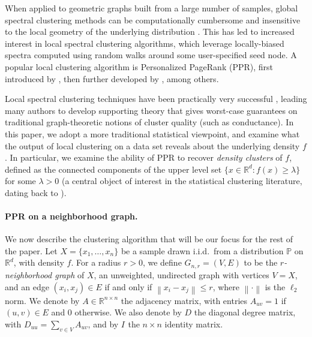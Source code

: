 \documentclass[11pt,twoside]{article}
\newcommand{\Reals}{\mathbb{R}}
\newcommand{\Rd}{\Reals^d}
\newcommand{\norm}[1]{\left\lVert#1\right\rVert}
\newcommand{\1}{\mathbf{1}}
\newcommand{\Abf}{A}
\newcommand{\Xbf}{X}             %
\newcommand{\Dbf}{D}
\newcommand{\Ibf}[1]{I_{#1}}
\newcommand{\Pbb}{\mathbb{P}}
\begin{document}
When applied to geometric graphs built from a large number of samples,
global spectral clustering methods can be computationally cumbersome and   
insensitive to the local geometry of the underlying distribution
\citep{leskovec2010,mahoney2012}.  This has led to increased interest in
local spectral clustering algorithms, which leverage locally-biased spectra
computed using random walks around some user-specified seed node.  A popular 
local clustering algorithm is Personalized PageRank (PPR), first introduced by 
\citet{haveliwala2003}, then further developed by
\citep{spielman2011,spielman2014,andersen2006,mahoney2012,zhu2013},
among others.  

Local spectral clustering techniques have been practically very successful
\citep{leskovec2010,andersen2012,gleich2012,mahoney2012,wu2012}, leading 
many authors to develop supporting theory
\citep{spielman2013,andersen2009,gharan2012,zhu2013} that gives worst-case
guarantees on traditional graph-theoretic notions of cluster quality (such as
conductance).  In this paper, we adopt a more traditional statistical viewpoint,
and examine what the output of local clustering on a data set reveals about the
underlying density $f$.  In particular, we examine the ability of PPR to recover
\emph{density clusters} of $f$, defined as the connected components of
the upper level set $\{x \in \Rd : f(x) \geq \lambda\}$ for some $\lambda > 0$
(a central object of interest in the statistical clustering literature, dating
back to \citet{hartigan1981}).   

\paragraph{PPR on a neighborhood graph.} We now describe the clustering
algorithm that will be our focus for the rest of the paper. Let $\Xbf = \{x_1,
\ldots, x_n\}$ be a sample drawn i.i.d.\ from a distribution $\Pbb$ on $\Rd$,
with density $f$.  For a radius $r > 0$, we define $G_{n,r}=(V,E)$ to be the
\emph{$r$-neighborhood graph} of $\Xbf$, an unweighted, undirected graph with
vertices $V=\Xbf$, and an edge $(x_i,x_j) \in E$ if and only if $\norm{x_i -
x_j} \leq r$, where $\norm{\cdot}$ is the $\ell_2$ norm. We denote by $\Abf \in
\Reals^{n \times n}$ the adjacency matrix, with entries $\Abf_{uv} = 1$ if
$(u,v) \in E$ and $0$ otherwise.  We also denote by $\Dbf$ the diagonal degree
matrix, with $\Dbf_{uu} = \sum_{v \in V} \Abf_{uv}$, and by $\Ibf{}$ the $n
\times n$ identity matrix.
\end{document}
